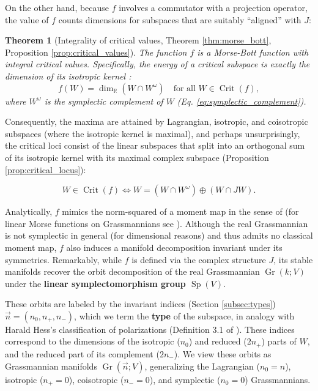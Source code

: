 \documentclass[12pt, final]{article}
\def\R{\mathbb{R}}
\def\Crit{\operatorname{Crit}}
\def\Sp{\operatorname{Sp}}
\def\Gr{\operatorname{Gr}}
\newtheorem{theorem}{Theorem}[section]
\begin{document}
On the other hand, because $f$ involves a commutator with a projection operator, the value of $f$ counts dimensions for subspaces that are suitably ``aligned'' with $J$:

\begin{theorem}[Integrality of critical values, Theorem \ref{thm:morse_bott}, Proposition \ref{prop:critical_values}]
The function $f$ is a Morse-Bott function with integral critical values. Specifically, the energy of a critical subspace is exactly the dimension of its isotropic kernel :
\begin{equation}
    f(W) = \dim_\R(W \cap W^\omega) \quad \text{for all } W \in \Crit(f),
\end{equation}
where $W^\omega$ is the symplectic complement of $W$ (Eq. \eqref{eq:symplectic_complement}).
\end{theorem}

Consequently, the maxima are attained by Lagrangian, isotropic, and coisotropic subspaces (where the isotropic kernel is maximal), and perhaps unsurprisingly, the critical loci consist of the linear subspaces that split into an orthogonal sum of its isotropic kernel with its maximal complex subspace (Proposition \ref{prop:critical_locus}):

\[ W \in \Crit(f) \iff W = (W \cap W^\omega) \oplus (W \cap JW).\]

Analytically, $f$ mimics the norm-squared of a moment map in the sense of \cite{Kirwan} (for linear Morse functions on Grassmannians see \cite{Hangan, TakeuchiFunction, DKV, Guest, BanyagaHurtubise, Nicolaescu}). Although the real Grassmannian is not symplectic in general (for dimensional reasons) and thus admits no classical moment map, $f$ also induces a manifold decomposition invariant under its symmetries. Remarkably, while $f$ is defined via the complex structure $J$, its stable manifolds recover the orbit decomposition of the real Grassmannian $\Gr(k;V)$ under the \textbf{linear symplectomorphism group $\Sp(V)$}.

These orbits are labeled by the invariant indices (Section \ref{subsec:types}) $\vec{n} = (n_0, n_+, n_-)$, which we term the \textbf{type} of the subspace, in analogy with Harald Hess's classification of polarizations (Definition 3.1 of \cite{Hess}). These indices correspond to the dimensions of the isotropic ($n_0$) and reduced ($2n_+$) parts of $W$, and the reduced part of its complement ($2n_-$). We view these orbits as Grassmannian manifolds $\Gr(\vec{n}; V)$, generalizing the Lagrangian ($n_0=n$), isotropic ($n_+ = 0$), coisotropic ($n_- = 0$), and symplectic ($n_0 = 0$) Grassmannians.
\end{document}
